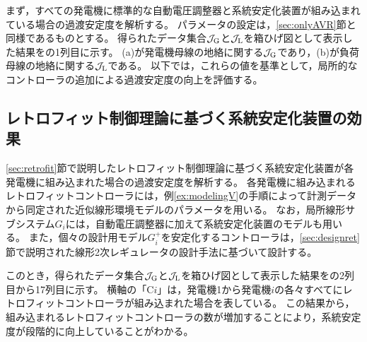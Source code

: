 \documentclass[tombow,dvipdfmx]{corona-a5-1.1}
\begin{document}
まず，すべての発電機に標準的な自動電圧調整器と系統安定化装置が組み込まれている場合の過渡安定度を解析する。
パラメータの設定は，\ref{sec:onlyAVR}節と同様であるものとする。
得られたデータ集合$\mathcal{J}_{\rm G}$と$\mathcal{J}_{\rm L}$を箱ひげ図として表示した結果をの1列目に示す。
(a)が発電機母線の地絡に関する$\mathcal{J}_{\rm G}$であり，(b)が負荷母線の地絡に関する$\mathcal{J}_{\rm L}$である。
以下では，これらの値を基準として，局所的なコントローラの追加による過渡安定度の向上を評価する。

\subsection{レトロフィット制御理論に基づく系統安定化装置の効果}

\ref{sec:retrofit}節で説明したレトロフィット制御理論に基づく系統安定化装置が各発電機に組み込まれた場合の過渡安定度を解析する。
各発電機に組み込まれるレトロフィットコントローラには，例\ref{ex:modelingV}の手順によって計測データから同定された近似線形環境モデルのパラメータを用いる。
なお，局所線形サブシステム$G_i$には，自動電圧調整器に加えて系統安定化装置のモデルも用いる。
また，個々の設計用モデル$G^+_i$を安定化するコントローラは，\ref{sec:designret}節で説明された線形2次レギュレータの設計手法に基づいて設計する。

このとき，得られたデータ集合$\mathcal{J}_{\rm G}$と$\mathcal{J}_{\rm L}$を箱ひげ図として表示した結果をの2列目から17列目に示す。
横軸の「C$i$」は，発電機1から発電機$i$の各々すべてにレトロフィットコントローラが組み込まれた場合を表している。
この結果から，組み込まれるレトロフィットコントローラの数が増加することにより，系統安定度が段階的に向上していることがわかる。
\end{document}
